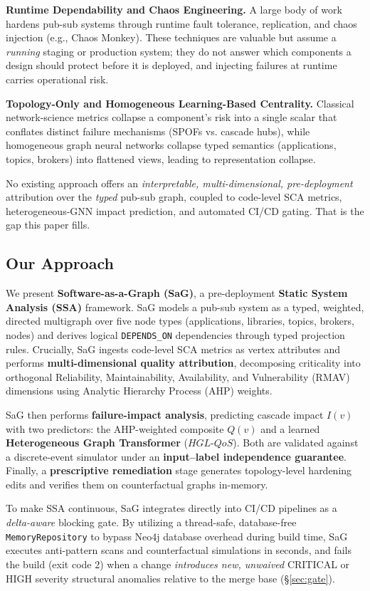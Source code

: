 \documentclass[review]{elsarticle}
\begin{document}
\textbf{Runtime Dependability and Chaos Engineering.} A large body of work hardens pub-sub systems
through runtime fault tolerance, replication, and chaos injection (e.g., Chaos Monkey). These
techniques are valuable but assume a \emph{running} staging or production system; they do not answer
which components a design should protect before it is deployed, and injecting failures at runtime
carries operational risk.

\textbf{Topology-Only and Homogeneous Learning-Based Centrality.} Classical network-science metrics
collapse a component's risk into a single scalar that conflates distinct failure mechanisms (SPOFs
vs. cascade hubs), while homogeneous graph neural networks collapse typed semantics (applications,
topics, brokers) into flattened views, leading to representation collapse.

No existing approach offers an \emph{interpretable, multi-dimensional, pre-deployment} attribution
over the \emph{typed} pub-sub graph, coupled to code-level SCA metrics, heterogeneous-GNN impact
prediction, and automated CI/CD gating. That is the gap this paper fills.

\subsection{Our Approach}

We present \textbf{Software-as-a-Graph (SaG)}, a pre-deployment \textbf{Static System Analysis
(SSA)} framework. SaG models a pub-sub system as a typed, weighted, directed multigraph over five
node types (applications, libraries, topics, brokers, nodes) and derives logical
\texttt{DEPENDS\_ON} dependencies through typed projection rules. Crucially, SaG ingests code-level
SCA metrics as vertex attributes and performs \textbf{multi-dimensional quality attribution},
decomposing criticality into orthogonal Reliability, Maintainability, Availability, and
Vulnerability (RMAV) dimensions using Analytic Hierarchy Process (AHP) weights.

SaG then performs \textbf{failure-impact analysis}, predicting cascade impact $I(v)$ with two
predictors: the AHP-weighted composite $Q(v)$ and a learned \textbf{Heterogeneous Graph Transformer}
($HGL\text{-}QoS$). Both are validated against a discrete-event simulator under an
\textbf{input--label independence guarantee}. Finally, a \textbf{prescriptive remediation} stage
generates topology-level hardening edits and verifies them on counterfactual graphs in-memory.

To make SSA continuous, SaG integrates directly into CI/CD pipelines as a \emph{delta-aware}
blocking gate. By utilizing a thread-safe, database-free \texttt{MemoryRepository} to bypass Neo4j
database overhead during build time, SaG executes anti-pattern scans and counterfactual simulations
in seconds, and fails the build (exit code 2) when a change \emph{introduces new, unwaived} CRITICAL
or HIGH severity structural anomalies relative to the merge base (\S\ref{sec:gate}).
\end{document}
